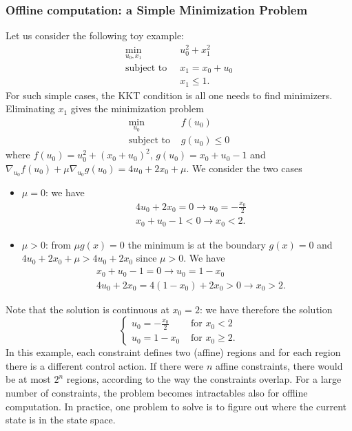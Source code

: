 \subsubsection{Offline computation: a Simple Minimization Problem}

Let us consider the following toy example:
\begin{align*}
  \min_{u_0,x_1} &\ u_0^2+x_1^2 \\
  \text{subject to } &\ x_1 = x_0+u_0 \\
                 &\ x_1\le 1.
\end{align*}
For such simple cases, the KKT condition is all one needs to find minimizers. Eliminating $x_1$ gives the minimization problem
\begin{align*}
  \min_{u_0}\  & f(u_0) \\
  \text{subject to } & g(u_0) \le 0
\end{align*}
where $f(u_0) = u_0^2 + (x_0+u_0)^2$, $g(u_0) = x_0 + u_0 - 1$ and $\nabla_{u_0} f(u_0) + \mu \nabla_{u_0} g(u_0) = 4u_0 + 2x_0 + \mu$. We consider the two cases
\begin{itemize}
\item $\mu = 0$: we have
  \begin{align*}
    & 4u_0 + 2x_0 = 0 \rightarrow u_0 = -\frac{x_0}{2} \\
    & x_0 + u_0 - 1 < 0 \rightarrow x_0 < 2.
  \end{align*}
\item $\mu > 0$: from $\mu g(x) = 0$ the minimum is at the boundary $g(x)=0$ and $4u_0+2x_0+\mu > 4u_0+2x_0$ since $\mu>0$. We have
  \begin{align*}
    &x_0 + u_0 - 1 = 0 \rightarrow u_0 = 1-x_0 \\
    &4u_0 + 2x_0 = 4(1-x_0) + 2x_0 > 0 \rightarrow x_0 > 2.
  \end{align*}
\end{itemize}
Note that the solution is continuous at $x_0=2$: we have therefore the solution
\begin{equation*}
  \begin{cases}
    u_0 = -\frac{x_0}{2} & \text{ for } x_0 < 2 \\
    u_0 = 1-x_0 & \text{ for } x_0 \ge 2.
  \end{cases}
\end{equation*}
In this example, each constraint defines two (affine) regions and for each region there is a different control action. If there were $n$ affine constraints, there would be at most $2^n$ regions, according to the way the constraints overlap. For a large number of constraints, the problem becomes intractables also for offline computation. In practice, one problem to solve is to figure out where the current state is in the state space.

